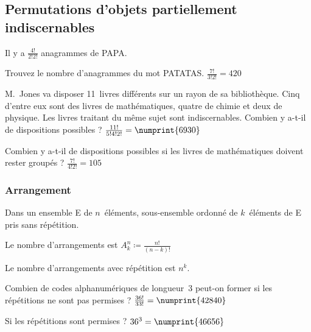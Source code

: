\subsection{Permutations d’objets partiellement indiscernables}
Il y a $\frac{4!}{2!2!}$ anagrammes de PAPA.

 Trouvez le nombre d’anagrammes du mot PATATAS.
 $\frac{7!}{3!2!} = 420$

 M.~Jones va disposer 11~livres différents sur un rayon de sa bibliothèque. Cinq d’entre eux sont des livres de mathématiques, quatre de chimie et deux de physique. Les livres traitant du même sujet sont indiscernables. Combien y a-t-il de dispositions possibles ?
\sol $\frac{11!}{5!4!2!} = \numprint{6930}$

\noindent Combien y a-t-il de dispositions possibles si les livres de mathématiques doivent rester groupés ?
\sol $\frac{7!}{4!2!} = 105$

\subsubsection{Arrangement}
Dans un ensemble E de $n$~éléments, sous-ensemble ordonné de $k$~éléments de E pris sans répétition.

Le nombre d’arrangements est $A_k^n \coloneqq \frac{n!}{(n-k)!}$

Le nombre d’arrangements avec répétition est $n^k$.

 Combien de codes alphanumériques de longueur~3 peut-on former si les répétitions ne sont pas permises ?
\sol $\frac{36!}{33!} = \numprint{42840}$

\noindent Si les répétitions sont permises ?
\sol $36^3 = \numprint{46656}$